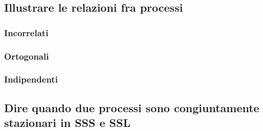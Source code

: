 \documentclass[12pt,oneside,openany]{memoir}
\numberwithin{equation}{subsection}
\begin{document}
\subsection{Illustrare le relazioni fra processi}


\subsubsection{Incorrelati}


\subsubsection{Ortogonali}


\subsubsection{Indipendenti}


\subsection{Dire quando due processi sono congiuntamente stazionari in SSS e
SSL}


\appendix

\end{document}
